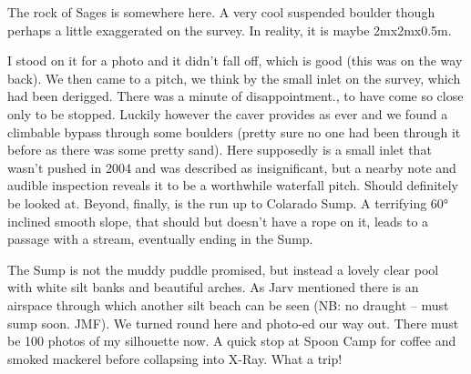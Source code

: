 The rock of Sages is somewhere here. A very cool suspended boulder though perhaps a little exaggerated on the survey. In reality, it is maybe 2mx2mx0.5m.

I stood on it for a photo and it didn't fall off, which is good (this was on the way back).
We then came to  a pitch, we think by the small inlet on the survey, which had been derigged. There was a minute of disappointment., to have come so close only to be stopped. Luckily however the caver provides as ever and we found a climbable bypass through some boulders (pretty sure no one had been through it before as there was some pretty sand).
Here supposedly is a small inlet that wasn't pushed in 2004 and was described as insignificant, but a nearby note and audible inspection reveals it to be a worthwhile waterfall pitch. Should definitely be looked at.
Beyond, finally, is the run up to Colarado Sump. A terrifying 60° inclined smooth slope, that should but doesn't have a rope on it,  leads to a passage with a stream, eventually ending in the Sump. 

The Sump is not the muddy puddle promised, but instead a lovely clear pool with white silt banks and beautiful arches. As Jarv mentioned there is an airspace through which another silt beach can be seen (NB: no draught – must sump soon. JMF). 
We turned round here and photo-ed our way out. There must be 100 photos of my silhouette now. A quick stop at Spoon Camp for coffee and smoked mackerel before collapsing into X-Ray. 
What a trip!

\begin{figure*}[t!]
\checkoddpage \ifoddpage \forcerectofloat \else \forceversofloat \fi

\end{figure*}
